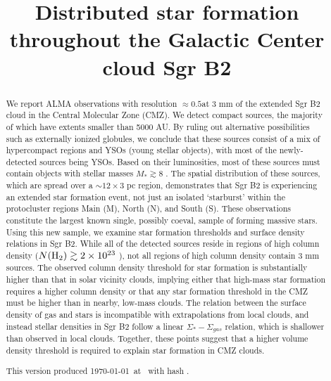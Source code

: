 \documentclass[twocolumn]{aastex61}
\begin{document}
\title{Distributed star formation throughout the Galactic Center cloud Sgr B2}

\begin{abstract}
We report ALMA observations with resolution $\approx0.5$\arcsec at 3 mm  of the
extended Sgr B2 cloud in the Central Molecular Zone (CMZ). We detect \ncores
compact sources, the majority of which have extents smaller than 5000 AU.  By
ruling out alternative possibilities such as externally ionized globules, we
conclude that these sources consist of a mix of hypercompact \hii regions and
YSOs (young stellar objects), with most of the newly-detected sources being
YSOs.  Based on their luminosities, most of these sources must contain objects
with stellar
masses $M_*\gtrsim8$ \msun.
The spatial distribution of these sources, which are spread over a
$\sim12\times3$ pc region, demonstrates that Sgr B2 is experiencing an extended
star formation event, not just an isolated `starburst' within the protocluster
regions Main (M), North (N), and South (S).
These observations constitute the largest known single, possibly
coeval, sample of forming massive stars.
Using this new sample, we examine
star formation thresholds and surface density relations in Sgr B2.  While all
of the detected sources reside in regions of high column density
($N(\textrm{H}_{2})\gtrsim2\times10^{23}$ \persc), not all regions of high column density
contain 3 mm sources.  The observed column density threshold for star formation is
substantially higher than that in solar vicinity clouds, implying either that
high-mass star formation requires a higher column density or that any star
formation threshold in the CMZ must be higher than in nearby, low-mass clouds.  The
relation between the surface density of gas and stars is incompatible with
extrapolations from local clouds, and instead stellar
densities in Sgr B2 follow a linear $\Sigma_*-\Sigma_{gas}$ relation,
which is shallower than observed in local clouds.
Together, these points suggest that a higher volume density threshold is
required to explain star formation in CMZ clouds.


This version produced \today\ at \currenttime\ with hash \githash.
\end{abstract}
\end{document}

